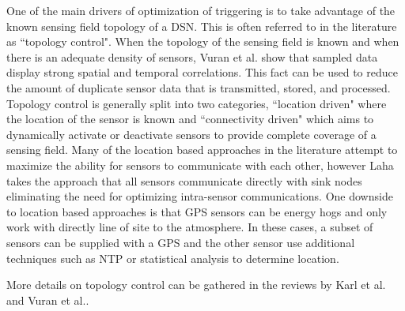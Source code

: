 One of the main drivers of optimization of triggering is to take advantage of the known sensing field topology of a DSN. This is often referred to in the literature as ``topology control"\cite{santi2005topology}. When the topology of the sensing field is known and when there is an adequate density of sensors, Vuran et al.\cite{luan2015fog} show that sampled data display strong spatial and temporal correlations. This fact can be used to reduce the amount of duplicate sensor data that is transmitted, stored, and processed. Topology control is generally split into two categories, ``location  driven" where the location of the sensor is known and ``connectivity driven" which aims to dynamically activate or deactivate sensors to provide complete coverage of a sensing field. Many of the location based approaches in the literature attempt  to maximize the ability for sensors to communicate with each other, however Laha takes the approach that all sensors communicate directly with sink nodes eliminating the need for optimizing intra-sensor communications. One downside to location based approaches is that GPS sensors can be energy hogs and only work with directly line of site to the atmosphere. In these cases, a subset of sensors can be supplied with a GPS and the other sensor use additional techniques such as NTP or statistical analysis to determine location\cite{langendoen2003distributed}.

More details on topology control can be gathered in the reviews by Karl et al.\cite{karl2007protocols} and Vuran et al.\cite{vuran2004spatio}.







